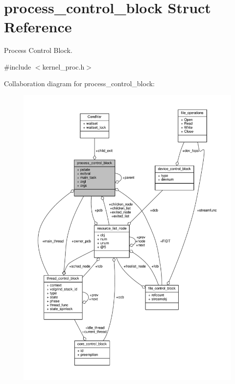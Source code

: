 \hypertarget{structprocess__control__block}{\section{process\-\_\-control\-\_\-block Struct Reference}
\label{structprocess__control__block}
}


Process Control Block.  




{\ttfamily \#include $<$kernel\-\_\-proc.\-h$>$}



Collaboration diagram for process\-\_\-control\-\_\-block\-:
\nopagebreak
\begin{figure}[H]
\begin{center}
\leavevmode
\includegraphics[width=350pt]{structprocess__control__block__coll__graph}
\end{center}
\end{figure}
